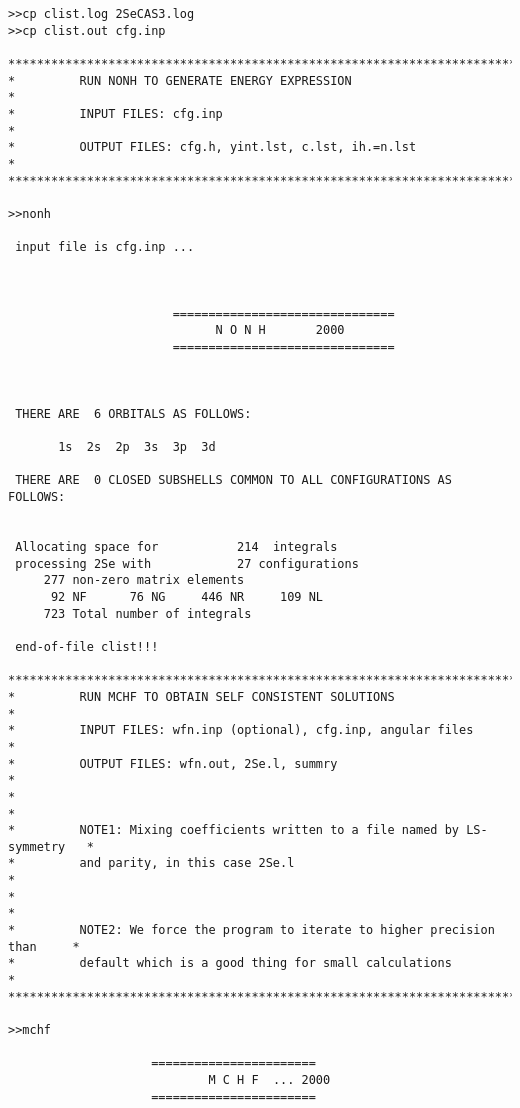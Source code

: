 \documentclass[fleqn,10pt]{book}
\begin{document}
\begin{verbatim}
>>cp clist.log 2SeCAS3.log
>>cp clist.out cfg.inp

*******************************************************************************
*         RUN NONH TO GENERATE ENERGY EXPRESSION                              *
*         INPUT FILES: cfg.inp                                                *
*         OUTPUT FILES: cfg.h, yint.lst, c.lst, ih.=n.lst                     *
*******************************************************************************

>>nonh

 input file is cfg.inp ...



                       ===============================
                             N O N H       2000
                       ===============================



 THERE ARE  6 ORBITALS AS FOLLOWS:

       1s  2s  2p  3s  3p  3d

 THERE ARE  0 CLOSED SUBSHELLS COMMON TO ALL CONFIGURATIONS AS FOLLOWS:


 Allocating space for           214  integrals
 processing 2Se with            27 configurations
     277 non-zero matrix elements
      92 NF      76 NG     446 NR     109 NL
     723 Total number of integrals

 end-of-file clist!!!

*******************************************************************************
*         RUN MCHF TO OBTAIN SELF CONSISTENT SOLUTIONS                        *
*         INPUT FILES: wfn.inp (optional), cfg.inp, angular files             *
*         OUTPUT FILES: wfn.out, 2Se.l, summry                                *
*                                                                             *
*         NOTE1: Mixing coefficients written to a file named by LS-symmetry   *
*         and parity, in this case 2Se.l                                      *
*                                                                             *
*         NOTE2: We force the program to iterate to higher precision than     *
*         default which is a good thing for small calculations                *
*******************************************************************************

>>mchf

                    =======================
                            M C H F  ... 2000
                    =======================





\end{verbatim}
\end{document}

